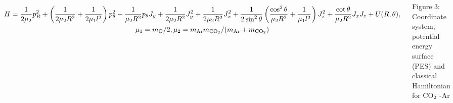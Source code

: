 \documentclass[
  20pt,
  a0paper,
  portrait,
  margin=0mm,
  innermargin=15mm,
  blockverticalspace=0mm,
  colspace=0mm,
  subcolspace=0mm
]{tikzposter}
\newcommand{\lb}{\left(}
\newcommand{\rb}{\right)}
\begin{document}
\begin{columns}
{{\begin{minipage}{0.4\linewidth}
\begin{tikzfigure}
\vspace{1cm}
	\includegraphics[width=0.75\linewidth]{../pictures/potential/potential_dpi.pdf}
	\label{fig:potential}
\end{tikzfigure}
\end{minipage}
\vspace*{-1cm}
\begin{gather}
H = \frac{1}{2 \mu_2} p_R^2 + \lb \frac{1}{2 \mu_2 R^2} + \frac{1}{2 \mu_1 l^2} \rb p_\theta^2 - \frac{1}{\mu_2 R^2} p_\theta J_y + \frac{1}{2 \mu_2 R^2} J_y^2 + \frac{1}{2 \mu_2 R^2} J_x^2 + \frac{1}{2 \sin^2 \theta} \lb \frac{\cos^2 \theta}{\mu_2 R^2} + \frac{1}{\mu_1 l^2} \rb J_z^2 
+ \frac{\cot \theta}{\mu_2 R^2} J_x J_z + U(R, \theta), \notag \\
\mu_1 = m_{\textup{O}} / 2, \mu_2 = m_{\textup{Ar}} m_{\textup{CO}_2} / (m_{\textup{Ar}} + m_{\textup{CO}_2}) \notag
\end{gather}
\begin{center}
Figure 3: Coordinate system, potential energy surface (PES) and classical Hamiltonian for CO$_2 \hspace{0.1cm}$-Ar
\end{center}

}}
\end{columns}
\end{document}
